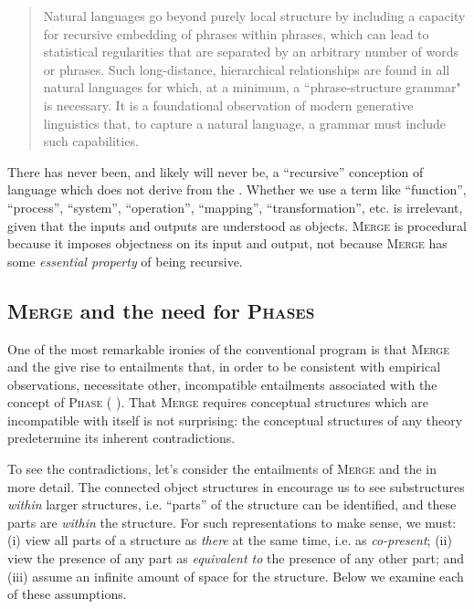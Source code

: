 \begin{quote}
Natural languages go beyond purely local structure by including a capacity for recursive embedding of phrases within phrases, which can lead to statistical regularities that are separated by an arbitrary number of words or phrases. Such long-distance, hierarchical relationships are found in all natural languages for which, at a minimum, a ``phrase-structure grammar" is necessary. It is a foundational observation of modern generative linguistics that, to capture a natural language, a grammar must include such capabilities. \citep[1577]{HauserEtAl2002}
\end{quote}

  There has never been, and likely will never be, a “recursive” conception of language which does not derive from the . Whether we use a term like “function”, “process”, “system”, “operation”, “mapping”, “transformation”, etc. is irrelevant, given that the inputs and outputs are understood as objects. \textsc{Merge} is procedural  because it imposes objectness on its input and output, not because \textsc{Merge} has some \textit{essential property} of being recursive.

\subsection{\textsc{Merge} and the need for \textsc{Phases}}

One of the most remarkable ironies of the conventional program is that \textsc{Merge} and the  give rise to entailments that, in order to be consistent with empirical observations, necessitate other, incompatible entailments associated with the concept of \textsc{ Phase} (\textsc{\citeauthor{Chomsky2001b} \citeyear*{Chomsky2001b,Chomsky2008}}). That \textsc{Merge} requires conceptual structures which are incompatible with itself is not surprising: the conceptual structures of any theory predetermine its inherent contradictions.

  To see the contradictions, let's consider the entailments of \textsc{Merge} and the  in more detail. The connected object structures in {} encourage us to see substructures \textit{within} larger structures, i.e. “parts” of the structure can be identified, and these parts are \textit{within} the structure. For such representations to make sense, we must: (i) view all parts of a structure as \textit{there} at the same time, i.e. as \textit{co-present}; (ii) view the presence of any part as \textit{equivalent to} the presence of any other part; and (iii) assume an infinite amount of space for the structure. Below we examine each of these assumptions.
  
